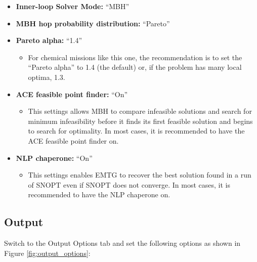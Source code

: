 \documentclass[11pt]{article}
\begin{document}
\begin{itemize}
	\item \textbf{Inner-loop Solver Mode:} ``\ac{MBH}''
	\item \textbf{\ac{MBH} hop probability distribution:} ``Pareto''
	\item \textbf{Pareto alpha:} ``1.4''
	\begin{itemize}
		\item For chemical missions like this one, the recommendation is to set the ``Pareto alpha'' to 1.4 (the default) or, if the problem has many local optima, 1.3.
	\end{itemize}
	\item \textbf{ACE feasible point finder:} ``On''
	\begin{itemize}
		\item This settings allows \ac{MBH} to compare infeasible solutions and search for minimum infeasibility before it finds its first feasible solution and begins to search for optimality. In most cases, it is recommended to have the ACE feasible point finder on.
	\end{itemize}
	\item \textbf{\ac{NLP} chaperone:} ``On''
	\begin{itemize}
		\item This settings enables \ac{EMTG} to recover the best solution found in a run of \ac{SNOPT} even if \ac{SNOPT} does not converge. In most cases, it is recommended to have the \ac{NLP} chaperone on.
	\end{itemize}
\end{itemize}

\subsection{Output}
\label{sec:output}

\noindent Switch to the Output Options tab and set the following options as shown in Figure \ref{fig:output_options}:
\end{document}
